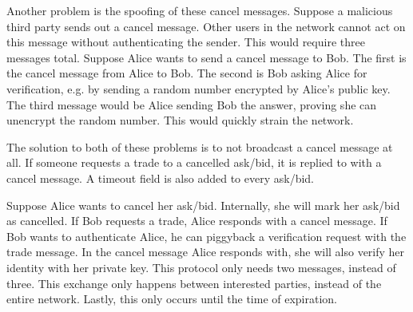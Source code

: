 \documentclass[]{article}
\begin{document}
Another problem is the spoofing of these cancel messages. Suppose a malicious third party sends out a cancel message. Other users in the network cannot act on this message without authenticating the sender. This would require three messages total. Suppose Alice wants to send a cancel message to Bob. The first is the cancel message from Alice to Bob. The second is Bob asking Alice for verification, e.g. by sending a random number encrypted by Alice's public key. The third message would be Alice sending Bob the answer, proving she can unencrypt the random number. This would quickly strain the network.

The solution to both of these problems is to not broadcast a cancel message at all. If someone requests a trade to a cancelled ask/bid, it is replied to with a cancel message. A timeout field is also added to every ask/bid.

Suppose Alice wants to cancel her ask/bid. Internally, she will mark her ask/bid as cancelled. If Bob requests a trade, Alice responds with a cancel message. If Bob wants to authenticate Alice, he can piggyback a verification request with the trade message. In the cancel message Alice responds with, she will also verify her identity with her private key. This protocol only needs two messages, instead of three. This exchange only happens between interested parties, instead of the entire network. Lastly, this only occurs until the time of expiration.
\end{document}
